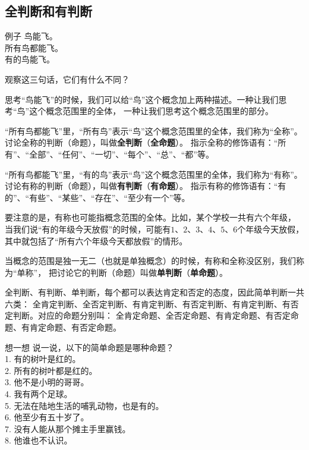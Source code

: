 \documentclass[12pt,UTF8,a4paper]{article}
\begin{document}
\subsection{全判断和有判断}

\begin{blockin}{例子}
    鸟能飞。\\
    所有鸟都能飞。\\
    有的鸟能飞。
\end{blockin}

观察这三句话，它们有什么不同？

思考“鸟能飞”的时候，我们可以给“鸟”这个概念加上两种描述。一种让我们思考“鸟”这个概念范围里的全体，
一种让我们思考这个概念范围里的部分。

“所有鸟都能飞”里，“所有鸟”表示“鸟”这个概念范围里的全体，我们称为“全称”。
讨论全称的判断（命题），叫做\textbf{全判断}（\textbf{全命题}）。
指示全称的修饰语有：“所有”、“全部”、“任何”、“一切”、“每个”、“总”、“都”等。

“所有鸟都能飞”里，“有的鸟”表示“鸟”这个概念范围里的全体，我们称为“有称”。
讨论有称的判断（命题），叫做\textbf{有判断}（\textbf{有命题}）。
指示有称的修饰语有：“有的”、“有些”、“某些”、“存在”、“至少有一个”等。

要注意的是，有称也可能指概念范围的全体。比如，某个学校一共有六个年级，
当我们说“有的年级今天放假”的时候，可能有$1$、$2$、$3$、$4$、$5$、$6$个年级今天放假，
其中就包括了“所有六个年级今天都放假”的情形。

当概念的范围是独一无二（也就是单独概念）的时候，有称和全称没区别，我们称为“单称”，
把讨论它的判断（命题）叫做\textbf{单判断}（\textbf{单命题}）。

全判断、有判断、单判断，每个都可以表达肯定和否定的态度，因此简单判断一共六类：
全肯定判断、全否定判断、有肯定判断、有否定判断、有肯定判断、有否定判断。对应的命题分别叫：
全肯定命题、全否定命题、有肯定命题、有否定命题、有肯定命题、有否定命题。

\begin{blockaft}{想一想}
    说一说，以下的简单命题是哪种命题？\\
    1. 有的树叶是红的。 \\
    2. 所有的树叶都是红的。\\
    3. 他不是小明的哥哥。\\
    4. 我有两个足球。 \\
    5. 无法在陆地生活的哺乳动物，也是有的。\\
    6. 他至少有五十岁了。\\
    7. 没有人能从那个摊主手里赢钱。 \\
    8. 他谁也不认识。
\end{blockaft}
\end{document}
